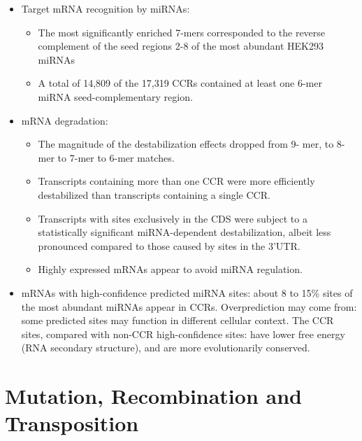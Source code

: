 \documentclass{report}
\begin{document}
\begin{itemize}
	\item Target mRNA recognition by miRNAs: 
	\begin{itemize}
		\item The most significantly enriched 7-mers corresponded to the reverse complement of the seed regions 2-8 of the most abundant HEK293 miRNAs
		\item A total of 14,809 of the 17,319 CCRs contained at least one 6-mer miRNA seed-complementary region. 
	\end{itemize}
	
	\item mRNA degradation: 
	\begin{itemize}
		\item The magnitude of the destabilization effects dropped from 9- mer, to 8-mer to 7-mer to 6-mer matches. 
		\item Transcripts containing more than one CCR were more efficiently destabilized than transcripts containing a single CCR. 
		\item Transcripts with sites exclusively in the CDS were subject to a statistically significant miRNA-dependent destabilization, albeit less pronounced compared to those caused by sites in the 3'UTR. 
		\item Highly expressed mRNAs appear to avoid miRNA regulation. 
	\end{itemize}
	
	\item mRNAs with high-confidence predicted miRNA sites: about 8 to 15\% sites of the most abundant miRNAs appear in CCRs. Overprediction may come from: some predicted sites may function in different cellular context. The CCR sites, compared with non-CCR high-confidence sites: have lower free energy (RNA secondary structure), and are more evolutionarily conserved. 
\end{itemize}


\section{Mutation, Recombination and Transposition}
\end{document}
